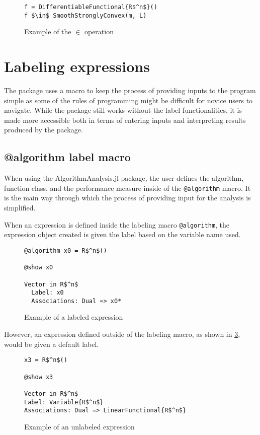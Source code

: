 \begin{figure}[h!]
	\begin{lstlisting}[mathescape]
f = DifferentiableFunctional{R$^n$}()
f $\in$ SmoothStronglyConvex(m, L)
	\end{lstlisting}
	\caption{Example of the $\in$ operation}
	\label{ex_in}
\end{figure}

\section{Labeling expressions}

The package uses a macro to keep the process of providing inputs to the program simple as some of the rules of programming might be difficult for novice users to navigate. While the package still works without the label functionalities, it is made more accessible both in terms of entering inputs and interpreting results produced by the package.

\subsection*{@algorithm label macro}

When using the AlgorithmAnalysis.jl package, the user defines the algorithm, function class, and the performance measure inside of the \texttt{@algorithm} macro. It is the main way through which the process of providing input for the analysis is simplified.

When an expression is defined inside the labeling macro \texttt{@algorithm}, the expression object created is given the label based on the variable name used.

\begin{figure}[h!]
	\begin{lstlisting}[mathescape]
@algorithm x0 = R$^n$()

@show x0

Vector in R$^n$
  Label: x0
  Associations: Dual => x0*
	\end{lstlisting}
	\caption{Example of a labeled expression}
	\label{ex_labeled}
\end{figure}

However, an expression defined outside of the labeling macro, as shown in \cref{ex_unlabeled}, would be given a default label.

\begin{figure}[h!]
	\begin{lstlisting}[mathescape]
x3 = R$^n$()

@show x3

Vector in R$^n$
Label: Variable{R$^n$}
Associations: Dual => LinearFunctional{R$^n$}
\end{lstlisting}
\caption{Example of an unlabeled expression}
\label{ex_unlabeled}
\end{figure}

